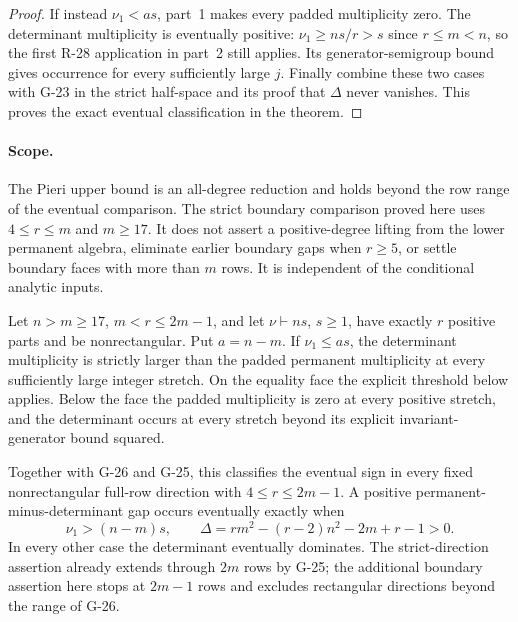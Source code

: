 \begin{proof}
If instead $\nu_1<as$, part~1 makes every padded multiplicity
zero. The determinant multiplicity is eventually positive:
$\nu_1\ge ns/r>s$ since $r\le m<n$, so the first R-28
application in part~2 still applies. Its generator-semigroup
bound gives occurrence for every sufficiently large $j$.
Finally combine these two cases with G-23 in the strict
half-space and its proof that $\Delta$ never vanishes. This
proves the exact eventual classification in the theorem.
\end{proof}

\paragraph{Scope.}
The Pieri upper bound is an all-degree reduction and holds
beyond the row range of the eventual comparison. The strict
boundary comparison proved here uses $4\le r\le m$ and
$m\ge17$. It does not assert a positive-degree lifting from
the lower permanent algebra, eliminate earlier boundary gaps
when $r\ge5$, or settle boundary faces with more than $m$
rows. It is independent of the conditional analytic inputs.


\begin{theorem}
\label{G-27}
Let $n>m\ge17$, $m<r\le2m-1$, and let
$\nu\vdash ns$, $s\ge1$, have exactly $r$ positive parts
and be nonrectangular. Put $a=n-m$. If $\nu_1\le as$,
the determinant multiplicity is strictly larger than the
padded permanent multiplicity at every sufficiently large
integer stretch. On the equality face the explicit threshold
below applies. Below the face the padded multiplicity is zero
at every positive stretch, and the determinant occurs at every
stretch beyond its explicit invariant-generator bound squared.

Together with G-26 and G-25, this classifies the eventual sign
in every fixed nonrectangular full-row direction with
$4\le r\le2m-1$. A positive permanent-minus-determinant gap
occurs eventually exactly when
\[
 \nu_1>(n-m)s,\qquad
 \Delta=rm^2-(r-2)n^2-2m+r-1>0.
\]
In every other case the determinant eventually dominates.
The strict-direction assertion already extends through $2m$
rows by G-25; the additional boundary assertion here stops
at $2m-1$ rows and excludes rectangular directions beyond
the range of G-26.
\end{theorem}

